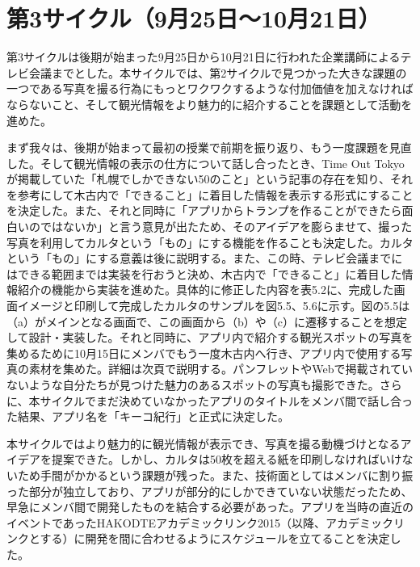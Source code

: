 \section{第3サイクル（9月25日～10月21日）}
第3サイクルは後期が始まった9月25日から10月21日に行われた企業講師によるテレビ会議までとした。本サイクルでは、第2サイクルで見つかった大きな課題の一つである写真を撮る行為にもっとワクワクするような付加価値を加えなければならないこと、そして観光情報をより魅力的に紹介することを課題として活動を進めた。
\par まず我々は、後期が始まって最初の授業で前期を振り返り、もう一度課題を見直した。そして観光情報の表示の仕方について話し合ったとき、Time Out Tokyoが掲載していた「札幌でしかできない50のこと」という記事の存在を知り、それを参考にして木古内で「できること」に着目した情報を表示する形式にすることを決定した。また、それと同時に「アプリからトランプを作ることができたら面白いのではないか」と言う意見が出たため、そのアイデアを膨らませて、撮った写真を利用してカルタという「もの」にする機能を作ることも決定した。カルタという「もの」にする意義は後に説明する。また、この時、テレビ会議までにはできる範囲までは実装を行おうと決め、木古内で「できること」に着目した情報紹介の機能から実装を進めた。具体的に修正した内容を表5.2に、完成した画面イメージと印刷して完成したカルタのサンプルを図5.5、5.6に示す。図の5.5は（a）がメインとなる画面で、この画面から（b）や（c）に遷移することを想定して設計・実装した。それと同時に、アプリ内で紹介する観光スポットの写真を集めるために10月15日にメンバでもう一度木古内へ行き、アプリ内で使用する写真の素材を集めた。詳細は次頁で説明する。パンフレットやWebで掲載されていないような自分たちが見つけた魅力のあるスポットの写真も撮影できた。さらに、本サイクルでまだ決めていなかったアプリのタイトルをメンバ間で話し合った結果、アプリ名を「キーコ紀行」と正式に決定した。
\par 本サイクルではより魅力的に観光情報が表示でき、写真を撮る動機づけとなるアイデアを提案できた。しかし、カルタは50枚を超える紙を印刷しなければいけないため手間がかかるという課題が残った。また、技術面としてはメンバに割り振った部分が独立しており、アプリが部分的にしかできていない状態だったため、早急にメンバ間で開発したものを結合する必要があった。アプリを当時の直近のイベントであったHAKODTEアカデミックリンク2015（以降、アカデミックリンクとする）に開発を間に合わせるようにスケジュールを立てることを決定した。\newpage

